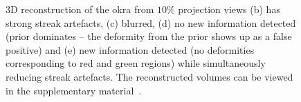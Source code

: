 \documentclass[journal]{IEEEtran}
\begin{document}
\begin{figure}[!h]
\hfill
{}
\caption{3D reconstruction of the okra from $10\%$ projection
  views (b) has strong streak artefacts, (c) blurred, (d) no new
  information detected (prior dominates -- the deformity from the prior
  shows up as a false positive) and (e) new information detected (no deformities
  corresponding to red and green regions) while simultaneously
  reducing streak artefacts. The reconstructed volumes can be viewed in the supplementary material~\cite{supp_paper}.}
\label{fig:okra_3D_results}
\end{figure}

\end{document}
